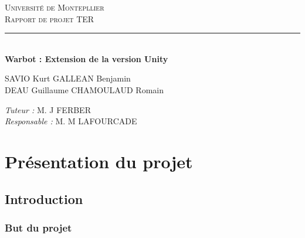 \documentclass{report}
\newcommand{\HRule}{\rule{\linewidth}{0.5mm}}
\begin{document}
\begin{titlepage}
  \begin{sffamily}
  \begin{center}


    \textsc{\LARGE Université de Montepllier}\\[2cm]

    \textsc{Rapport de projet TER}\\[1.5cm]

    \HRule \\[0.4cm]
    { \huge \bfseries Warbot : Extension de la version Unity\\[0.4cm] }

    \vfill
    \begin{minipage}{0.4\textwidth}
      \begin{flushleft} \large
        SAVIO Kurt \newline GALLEAN Benjamin\\

         DEAU Guillaume CHAMOULAUD Romain\\
      \end{flushleft}
    \end{minipage}
    \begin{minipage}{0.4\textwidth}
      \begin{flushright} \large
        \emph{Tuteur :} M. J \textsc{FERBER}\\
        \emph{Responsable : } M. M \textsc{LAFOURCADE}
      \end{flushright}
    \end{minipage}

  \end{center}
  \end{sffamily}
\end{titlepage}

\newpage
\tableofcontents
\newpage

\part{Présentation du projet}
\chapter{Introduction}
\section{But du projet}
\end{document}
